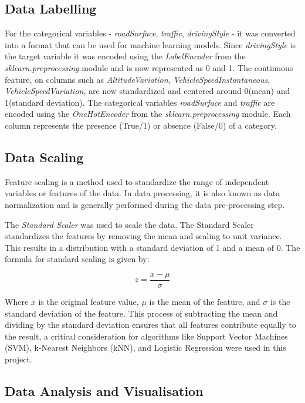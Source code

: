 \documentclass[10pt,journal,compsoc]{IEEEtran}
\begin{document}
\subsection{Data Labelling}

For the categorical variables - \textit{roadSurface}, \textit{traffic}, \textit{drivingStyle} - it was converted into a format that can be used for machine learning models. 
Since \textit{drivingStyle} is the target variable it was encoded using the \textit{LabelEncoder} from the \textit{sklearn.preprocessing} module and is now represented as 0 and 1. The continuous feature, on columns such as \textit{AltitudeVariation}, 
\textit{VehicleSpeedInstantaneous}, \textit{VehicleSpeedVariation}, are now standardized and centered around 0(mean) and 1(standard deviation). 
The categorical variables \textit{roadSurface} and \textit{traffic} are encoded using the \textit{OneHotEncoder} from the \textit{sklearn.preprocessing} module. Each column represents
the presence (True/1) or absence (False/0) of a category.

\subsection{Data Scaling}

Feature scaling is a method used to standardize the range of independent variables or features of the data. In data processing, it is also known as data 
normalization and is generally performed during the data pre-processing step.

The \textit{Standard Scaler} was used to scale the data. The Standard Scaler standardizes the features by removing the mean and scaling to unit variance.
This results in a distribution with a standard deviation of 1 and a mean of 0. The formula for standard scaling is given by:

\begin{equation}
    z = \frac{x - \mu}{\sigma}
\end{equation}

Where $x$ is the original feature value, $\mu$ is the mean of the feature, and $\sigma$ is the standard deviation of the feature. This process of subtracting the mean and 
dividing by the standard deviation ensures that all features contribute equally to the result, a critical consideration for algorithms like Support Vector Machines (SVM), 
k-Nearest Neighbors (kNN), and Logistic Regression were used in this project.


\subsection{Data Analysis and Visualisation}
\end{document}
